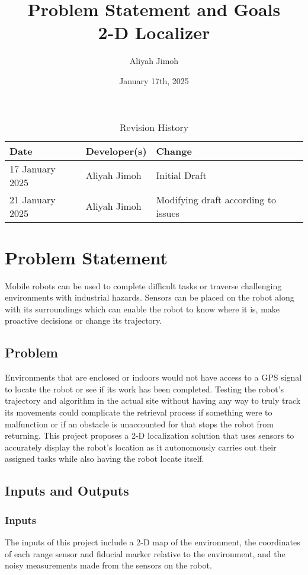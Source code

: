 \documentclass{article}
\title{Problem Statement and Goals\\2-D Localizer}
\author{Aliyah Jimoh}
\date{January 17th, 2025}
\begin{document}
\maketitle

\begin{table}[hp]
\caption{Revision History} \label{TblRevisionHistory}
\begin{tabularx}{\textwidth}{llX}
\toprule
\textbf{Date} & \textbf{Developer(s)} & \textbf{Change}\\
\midrule
17 January 2025 & Aliyah Jimoh & Initial Draft\\
21 January 2025 & Aliyah Jimoh & Modifying draft according to issues\\

\bottomrule
\end{tabularx}
\end{table}

\section{Problem Statement}
Mobile robots can be used to complete difficult tasks or traverse challenging environments with industrial hazards. Sensors can be placed on the robot along with its surroundings which can enable the robot to know where it is, make proactive decisions or change its trajectory.

\subsection{Problem}
Environments that are enclosed or indoors would not have access to a GPS signal to locate the robot or see if its work has been completed. Testing the robot's trajectory and algorithm in the actual site without having any way to truly track its movements could complicate the retrieval process if something were to malfunction or if an obstacle is unaccounted for that stops the robot from returning. This project proposes a 2-D localization solution that uses sensors to accurately display the robot's location as it autonomously carries out their assigned tasks while also having the robot locate itself.

\subsection{Inputs and Outputs}

\subsubsection{Inputs}
The inputs of this project include a 2-D map of the environment, the coordinates of each range sensor and fiducial marker relative to the environment, and the noisy measurements made from the sensors on the robot.
\end{document}
